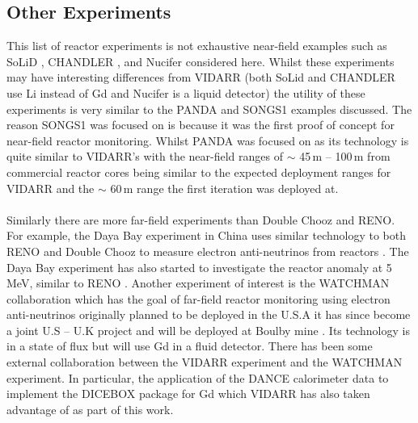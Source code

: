 \subsection{Other Experiments}
This list of reactor experiments is not exhaustive near-field examples such as SoLiD \cite{Solid_readout}, CHANDLER \cite{aap2015}, and Nucifer \cite{nucifer2016} considered here. Whilst these experiments may have interesting differences from VIDARR (both SoLid and CHANDLER use Li instead of Gd and Nucifer is a liquid detector) the utility of these experiments is very similar to the PANDA and SONGS1 examples discussed. The reason SONGS1 was focused on is because it was the first proof of concept for near-field reactor monitoring. Whilst PANDA was focused on as its technology is quite similar to VIDARR's with the near-field ranges of $\sim$ 45\,m -- 100\,m from commercial reactor cores being similar to the expected deployment ranges for VIDARR and the $\sim$ 60\,m range the first iteration was deployed at. 
\\\\Similarly there are more far-field experiments than Double Chooz and RENO. For example, the Daya Bay experiment in China uses similar technology to both RENO and Double Chooz to measure electron anti-neutrinos from reactors \cite{DayaBay2007Precision}. The Daya Bay experiment has also started to investigate the reactor anomaly at 5\,MeV, similar to RENO \cite{Daya_Bay_2017}. Another experiment of interest is the WATCHMAN collaboration which has the goal of far-field reactor monitoring using electron anti-neutrinos originally planned to be deployed in the U.S.A \cite{askins2015physics} it has since become a joint U.S -- U.K project and will be deployed at Boulby mine \cite{burns2018remote}. Its technology is in a state of flux but will use Gd in a fluid detector. There has been some external collaboration between the VIDARR experiment and the WATCHMAN experiment. In particular, the application of the DANCE calorimeter data to implement the DICEBOX package for Gd which VIDARR has also taken advantage of as part of this work. 


